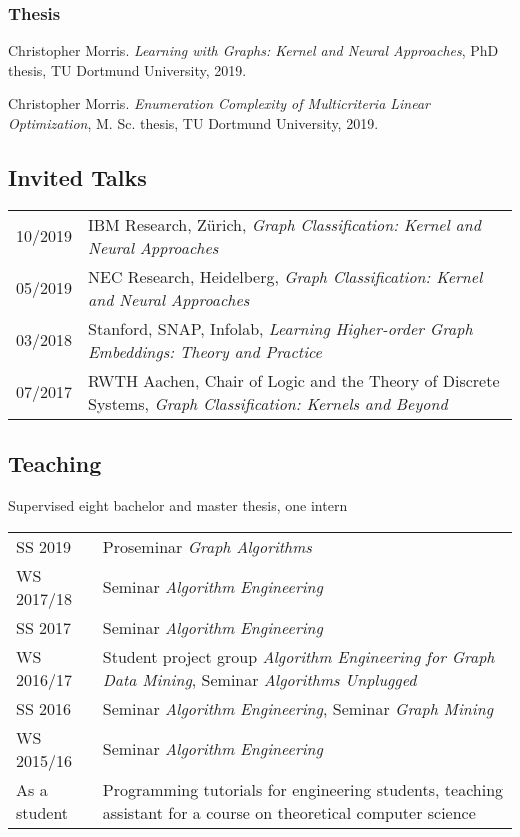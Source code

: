 \documentclass[11pt, a4paper]{scrartcl}
\begin{document}
\begin{thebibliography}{5}
\subsubsection*{Thesis}

Christopher Morris.
\emph{Learning with Graphs: Kernel and Neural Approaches}, PhD thesis, TU Dortmund University, 2019.

Christopher Morris.
\emph{Enumeration Complexity of Multicriteria Linear Optimization}, M. Sc. thesis, TU Dortmund University, 2019.

	
\end{thebibliography}

\subsection*{Invited Talks}
\begin{tabular}{p{2.1cm}p{12.0cm}}
10/2019&IBM Research, Zürich, \emph{Graph Classification: Kernel and Neural Approaches}\\
05/2019&NEC Research, Heidelberg, \emph{Graph Classification: Kernel and Neural Approaches}\\ 
03/2018&Stanford, SNAP, Infolab, \emph{Learning Higher-order Graph Embeddings: Theory and Practice}\\
07/2017&RWTH Aachen, Chair of Logic and the Theory of Discrete Systems, \emph{Graph Classification: Kernels and Beyond}\\

\end{tabular}





\subsection*{Teaching}

Supervised eight bachelor and master thesis, one intern\\

\begin{tabular}{p{3.1cm}p{12.0cm}}
SS 2019&Proseminar \emph{Graph Algorithms}\\
WS 2017/18&Seminar \emph{Algorithm Engineering}\\
SS 2017&Seminar \emph{Algorithm Engineering}\\
WS 2016/17&Student project group \emph{Algorithm Engineering for Graph Data Mining}, Seminar \emph{Algorithms Unplugged}\\
SS 2016&Seminar \emph{Algorithm Engineering}, Seminar \emph{Graph Mining}\\
WS 2015/16& Seminar \emph{Algorithm Engineering}\\
As a student& Programming tutorials for engineering students, teaching assistant for a course on theoretical computer science\\
\end{tabular}
\end{document}
